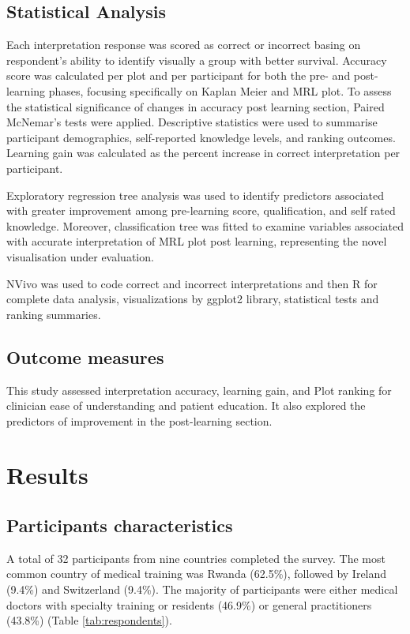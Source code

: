 \documentclass[
  onecolumn]{article}
\begin{document}
\subsection{Statistical Analysis}\label{statistical-analysis}

Each interpretation response was scored as correct or incorrect basing
on respondent's ability to identify visually a group with better
survival. Accuracy score was calculated per plot and per participant for
both the pre- and post-learning phases, focusing specifically on Kaplan
Meier and MRL plot. To assess the statistical significance of changes in
accuracy post learning section, Paired McNemar's tests were applied.
Descriptive statistics were used to summarise participant demographics,
self-reported knowledge levels, and ranking outcomes. Learning gain was
calculated as the percent increase in correct interpretation per
participant.

Exploratory regression tree analysis was used to identify predictors
associated with greater improvement among pre-learning score,
qualification, and self rated knowledge. Moreover, classification tree
was fitted to examine variables associated with accurate interpretation
of MRL plot post learning, representing the novel visualisation under
evaluation.

NVivo was used to code correct and incorrect interpretations and then R
for complete data analysis, visualizations by ggplot2 library,
statistical tests and ranking summaries.

\subsection{Outcome measures}\label{outcome-measures}

This study assessed interpretation accuracy, learning gain, and Plot
ranking for clinician ease of understanding and patient education. It
also explored the predictors of improvement in the post-learning
section.

\section{Results}\label{results}

\subsection{Participants
characteristics}\label{participants-characteristics}

A total of 32 participants from nine countries completed the survey. The
most common country of medical training was Rwanda (62.5\%), followed by
Ireland (9.4\%) and Switzerland (9.4\%). The majority of participants
were either medical doctors with specialty training or residents
(46.9\%) or general practitioners (43.8\%) (Table
\ref{tab:respondents}).
\end{document}
